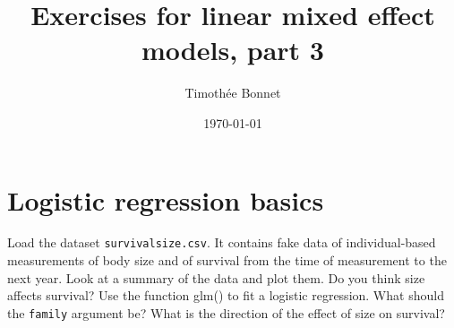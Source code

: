\documentclass[12pt,a4paper]{scrartcl}\usepackage[]{graphicx}\usepackage[]{color}
\title{Exercises for linear mixed effect models, part 3}
\date{\today}
\author{Timoth\'ee Bonnet}
\begin{document}
\maketitle

\tableofcontents
\ListOfExerciseInToc
{}

\clearpage 



\section{Logistic regression basics}

\begin{Exercise}[difficulty=1, title={Fit with glm()}]
Load the dataset \texttt{survivalsize.csv}. It contains fake data of individual-based measurements of body size and of survival from the time of measurement to the next year. Look at a summary of the data and plot them. Do you think size affects survival?
Use the function glm() to fit a logistic regression. What should the \texttt{family} argument be? What is the direction of the effect of size on survival?
\end{Exercise}
\end{document}
